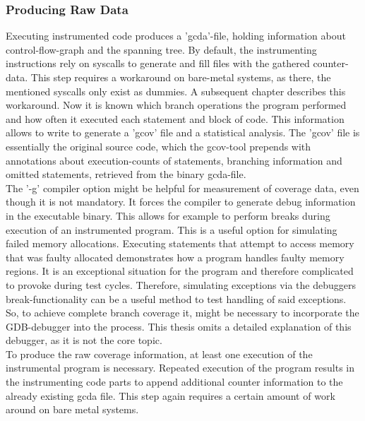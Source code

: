 				
			\subsubsection{Producing Raw Data}
				Executing instrumented code produces a 'gcda'-file, holding information about control-flow-graph and the spanning tree. By default, the instrumenting instructions rely on syscalls to generate and fill files with the gathered counter-data. This step requires a workaround on bare-metal systems, as there, the mentioned syscalls only exist as dummies. A subsequent chapter describes this workaround. Now it is known which branch operations the program performed and how often it executed  each statement and block of code. This information allows to write to generate a 'gcov' file and a statistical analysis. The 'gcov' file is essentially the original source code, which the gcov-tool prepends with annotations about execution-counts of statements, branching information and omitted statements, retrieved from the binary gcda-file. \\

				The '-g' compiler option might be helpful for measurement of coverage data, even though it is not mandatory. It forces the compiler to generate debug information in the executable binary. This allows for example to perform breaks during execution of an instrumented program. This is a useful option for simulating failed memory allocations. Executing statements that attempt to access memory that was faulty allocated demonstrates how a program handles faulty memory regions. It is an exceptional situation for the program and therefore complicated to provoke during test cycles. Therefore, simulating exceptions via the debuggers break-functionality can be a useful method to test handling of said exceptions. So, to achieve complete branch coverage it, might be necessary to incorporate the GDB-debugger into the process. This thesis omits a detailed explanation of this debugger, as it is not the core topic. \cite{gcov} \\
				
				To produce the raw coverage information, at least one execution of the instrumental program is necessary. Repeated execution of the program results in the instrumenting code parts to append additional counter information to the already existing gcda file. This step again requires a certain amount of work around on bare metal systems.
